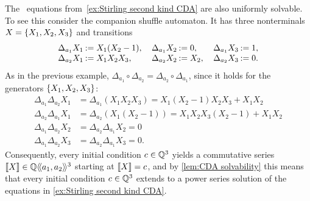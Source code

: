 \begin{example}
    The \CDA~equations from~\cref{ex:Stirling second kind CDA} are also uniformly solvable.
    To see this consider the companion shuffle automaton.
    It has three nonterminals $X = \left\{X_1, X_2, X_3\right\}$ and transitions
    \begin{align*}
        \arraycolsep=1pt
        \begin{array}{rl}
            \Delta_{a_1} X_1 &:= X_1 (X_2 - 1), \\
            \Delta_{a_2} X_1 &:= X_1 X_2 X_3,
        \end{array}
        \quad
        \begin{array}{rl}
            \Delta_{a_1} X_2 &:= 0, \\
            \Delta_{a_2} X_2 &:= X_2,
        \end{array}
        \quad
        \begin{array}{rl}
            \Delta_{a_1} X_3 &:= 1, \\
            \Delta_{a_2} X_3 &:= 0.
        \end{array}
    \end{align*}
    As in the previous example,
    $\Delta_{a_1} \circ \Delta_{a_2} = \Delta_{a_2} \circ \Delta_{a_1}$,
    since it holds for the generators $\left\{X_1, X_2, X_3\right\}$:
    \begin{align*}
        \Delta_{a_1} \Delta_{a_2} X_1
            &= \Delta_{a_1} (X_1 X_2 X_3)
            = X_1 (X_2 - 1) X_2 X_3 + X_1 X_2 \\
        \Delta_{a_2} \Delta_{a_1} X_1
            &= \Delta_{a_2} (X_1 (X_2 - 1))
            = X_1 X_2 X_3 (X_2 - 1) + X_1 X_2 \\
        \Delta_{a_1} \Delta_{a_2} X_2
            &= \Delta_{a_2} \Delta_{a_1} X_2 = 0 \\
        \Delta_{a_1} \Delta_{a_2} X_3
            &= \Delta_{a_2} \Delta_{a_1} X_3 = 0.
    \end{align*}
    Consequently, every initial condition $c \in \mathbb Q^3$
    yields a commutative series $\llbracket X\rrbracket \in \mathbb Q\langle\!\langle a_1, a_2\rangle\!\rangle^3$ starting at $\llbracket X\rrbracket = c$,
    and by \cref{lem:CDA solvability} this means that every initial condition $c \in \mathbb Q^3$
    extends to a power series solution of the \CDA{} equations in \cref{ex:Stirling second kind CDA}.

\end{example}

